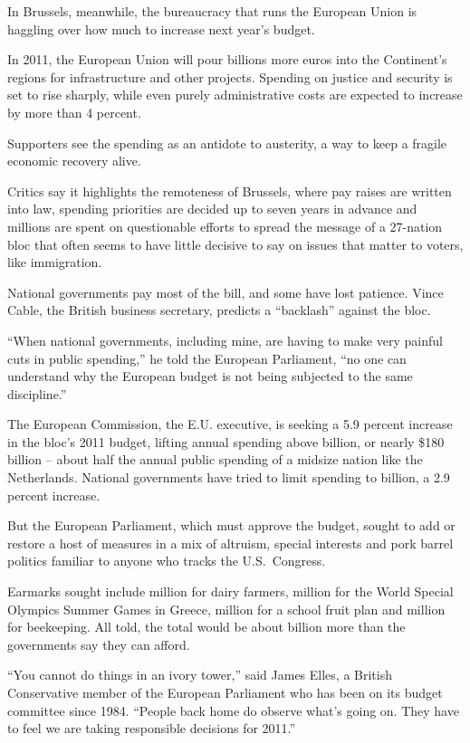 ﻿\documentclass[12pt]{article}
\begin{document}
In Brussels, meanwhile, the bureaucracy that runs the European Union is haggling over how much to
increase next year's budget.

In 2011, the European Union will pour billions more euros into the Continent's regions for
infrastructure and other projects. Spending on justice and security is set to rise sharply, while
even purely administrative costs are expected to increase by more than 4 percent.

Supporters see the spending as an antidote to austerity, a way to keep a fragile economic recovery
alive.

Critics say it highlights the remoteness of Brussels, where pay raises are written into law,
spending priorities are decided up to seven years in advance and millions are spent on questionable
efforts to spread the message of a 27-nation bloc that often seems to have little decisive to say on
issues that matter to voters, like immigration.

National governments pay most of the bill, and some have lost patience. Vince Cable, the British
business secretary, predicts a ``backlash'' against the bloc.

``When national governments, including mine, are having to make very painful cuts in public
spending,'' he told the European Parliament, ``no one can understand why the European budget is not
being subjected to the same discipline.''

The European Commission, the E.U. executive, is seeking a 5.9 percent increase in the bloc's 2011
budget, lifting annual spending above  billion, or nearly \$180 billion -- about half
the annual public spending of a midsize nation like the Netherlands. National governments have tried
to limit spending to  billion, a 2.9 percent increase.

But the European Parliament, which must approve the budget, sought to add or restore a host of
measures in a mix of altruism, special interests and pork barrel politics familiar to anyone who
tracks the U.S.~Congress.

Earmarks sought include  million for dairy farmers,  million for the World
Special Olympics Summer Games in Greece,  million for a school fruit plan and 
million for beekeeping. All told, the total would be about  billion more than the
governments say they can afford.

``You cannot do things in an ivory tower,'' said James Elles, a British Conservative member of the
European Parliament who has been on its budget committee since 1984. ``People back home do observe
what's going on. They have to feel we are taking responsible decisions for 2011.''
\end{document}
